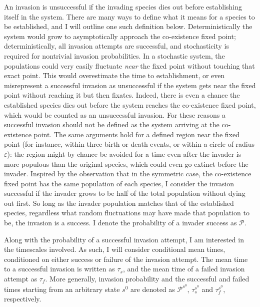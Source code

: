 An invasion is unsuccessful if the invading species dies out before establishing itself in the system. 
There are many ways to define what it means for a species to be established, and I will outline one such definition below. 
Deterministically the system would grow to asymptotically approach the co-existence fixed point; deterministically, all invasion attempts are successful, and stochasticity is required for nontrivial invasion probabilities. 
In a stochastic system, the populations could very easily fluctuate \emph{near} the fixed point without touching that exact point. This would overestimate the time to establishment, or even misrepresent a successful invasion as unsuccessful if the system gets near the fixed point without reaching it but then fixates. 
Indeed, there is even a chance the established species dies out before the system reaches the co-existence fixed point, which would be counted as an unsuccessful invasion. 
For these reasons a successful invasion should not be defined as the system arriving at the co-existence point. 
The same arguments hold for a defined region near the fixed point (for instance, within three birth or death events, or within a circle of radius $\varepsilon$): the region might by chance be avoided for a time even after the invader is more populous than the original species, which could even go extinct before the invader. 
Inspired by the observation that in the symmetric case, the co-existence fixed point has the same population of each species, I consider the invasion successful if the invader grows to be half of the total population without dying out first. 
So long as the invader population matches that of the established species, regardless what random fluctuations may have made that population to be, the invasion is a success. %
I denote the probability of a invader success as $\mathcal{P}$. 

Along with the probability of a successful invasion attempt, I am interested in the timescales involved. 
As such, I will consider conditional mean times, conditioned on either success or failure of the invasion attempt. 
The mean time to a successful invasion is written as $\tau_s$, and the mean time of a failed invasion attempt as $\tau_f$. 
More generally, invasion probability and the successful and failed times starting from an arbitrary state $s^0$ are denoted as $\mathcal{P}^{s^0}$, $\tau_s^{s^0}$ and $\tau_f^{s^0}$, respectively. 

